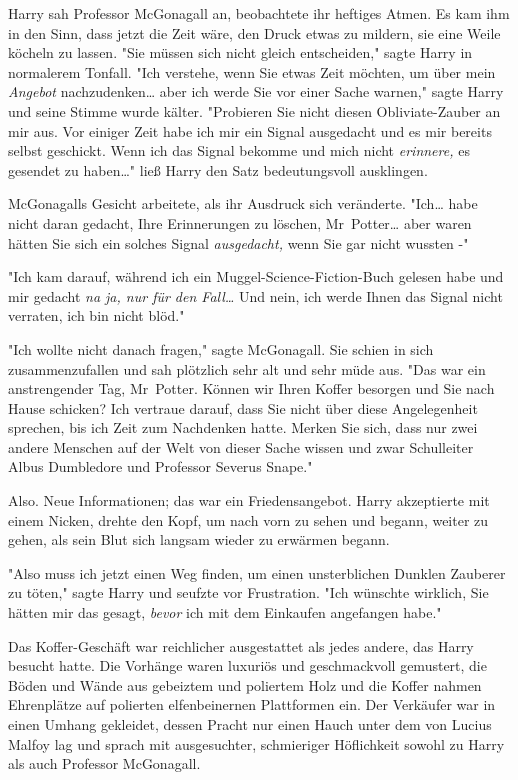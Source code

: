 {Harry sah Professor McGonagall an, beobachtete ihr heftiges Atmen. Es kam ihm in den Sinn, dass jetzt die Zeit wäre, den Druck etwas zu mildern, sie eine Weile köcheln zu lassen. "Sie müssen sich nicht gleich entscheiden," sagte Harry in normalerem Tonfall. "Ich verstehe, wenn Sie etwas Zeit möchten, um über mein \emph{Angebot} nachzudenken… aber ich werde Sie vor einer Sache warnen," sagte Harry und seine Stimme wurde kälter. "Probieren Sie nicht diesen Obliviate-Zauber an mir aus. Vor einiger Zeit habe ich mir ein Signal ausgedacht und es mir bereits selbst geschickt. Wenn ich das Signal bekomme und mich nicht \emph{erinnere,} es gesendet zu haben…" ließ Harry den Satz bedeutungsvoll ausklingen.

McGonagalls Gesicht arbeitete, als ihr Ausdruck sich veränderte. "Ich… habe nicht daran gedacht, Ihre Erinnerungen zu löschen, Mr~Potter… aber waren hätten Sie sich ein solches Signal \emph{ausgedacht,} wenn Sie gar nicht wussten -"

"Ich kam darauf, während ich ein Muggel-Science-Fiction-Buch gelesen habe und mir gedacht \emph{na ja, nur für den Fall…} Und nein, ich werde Ihnen das Signal nicht verraten, ich bin nicht blöd."

"Ich wollte nicht danach fragen," sagte McGonagall. Sie schien in sich zusammenzufallen und sah plötzlich sehr alt und sehr müde aus. "Das war ein anstrengender Tag, Mr~Potter. Können wir Ihren Koffer besorgen und Sie nach Hause schicken? Ich vertraue darauf, dass Sie nicht über diese Angelegenheit sprechen, bis ich Zeit zum Nachdenken hatte. Merken Sie sich, dass nur zwei andere Menschen auf der Welt von dieser Sache wissen und zwar Schulleiter Albus Dumbledore und Professor Severus Snape."

Also. Neue Informationen; das war ein Friedensangebot. Harry akzeptierte mit einem Nicken, drehte den Kopf, um nach vorn zu sehen und begann, weiter zu gehen, als sein Blut sich langsam wieder zu erwärmen begann.

"Also muss ich jetzt einen Weg finden, um einen unsterblichen Dunklen Zauberer zu töten," sagte Harry und seufzte vor Frustration. "Ich wünschte wirklich, Sie hätten mir das gesagt, \emph{bevor} ich mit dem Einkaufen angefangen habe."

\later

Das Koffer-Geschäft war reichlicher ausgestattet als jedes andere, das Harry besucht hatte. Die Vorhänge waren luxuriös und geschmackvoll gemustert, die Böden und Wände aus gebeiztem und poliertem Holz und die Koffer nahmen Ehrenplätze auf polierten elfenbeinernen Plattformen ein. Der Verkäufer war in einen Umhang gekleidet, dessen Pracht nur einen Hauch unter dem von Lucius Malfoy lag und sprach mit ausgesuchter, schmieriger Höflichkeit sowohl zu Harry als auch Professor McGonagall.

}

